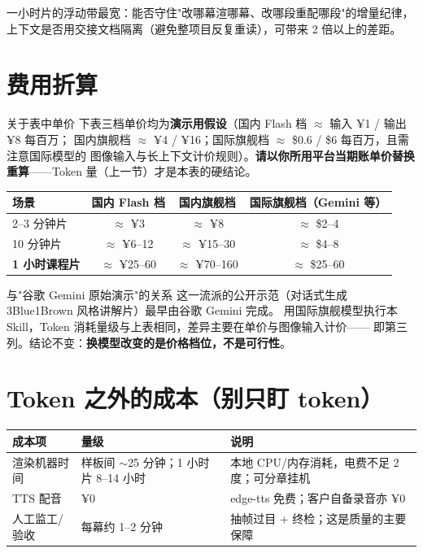 \documentclass[12pt,a4paper]{ctexart}
\begin{document}
一小时片的浮动带最宽：能否守住"改哪幕渲哪幕、改哪段重配哪段"的增量纪律，
上下文是否用交接文档隔离（避免整项目反复重读），可带来 2 倍以上的差距。

\section{费用折算}\label{sec:price}

\begin{warnbox}{关于表中单价}
下表三档单价均为\textbf{演示用假设}（国内 Flash 档 $\approx$ 输入 ¥1 / 输出 ¥8 每百万；
国内旗舰档 $\approx$ ¥4 / ¥16；国际旗舰档 $\approx$ \$0.6 / \$6 每百万，且需注意国际模型的
图像输入与长上下文计价规则）。\textbf{请以你所用平台当期账单价替换重算}——Token 量（上一节）才是本表的硬结论。
\end{warnbox}

\begin{center}
\begin{tabular}{p{3.4cm} c c c}
\hline
\rowcolor{ptbg} 场景 & 国内 Flash 档 & 国内旗舰档 & 国际旗舰档（Gemini 等） \\
\hline
2--3 分钟片 & $\approx$ ¥3 & $\approx$ ¥8 & $\approx$ \$2--4 \\
10 分钟片 & $\approx$ ¥6--12 & $\approx$ ¥15--30 & $\approx$ \$4--8 \\
\textbf{1 小时课程片} & $\approx$ ¥25--60 & $\approx$ ¥70--160 & $\approx$ \$25--60 \\
\hline
\end{tabular}
\end{center}

\begin{infobox}{与"谷歌 Gemini 原始演示"的关系}
这一流派的公开示范（对话式生成 3Blue1Brown 风格讲解片）最早由谷歌 Gemini 完成。
用国际旗舰模型执行本 Skill，Token 消耗量级与上表相同，差异主要在单价与图像输入计价——
即第三列。结论不变：\textbf{换模型改变的是价格档位，不是可行性}。
\end{infobox}

\section{Token 之外的成本（别只盯 token）}

\begin{center}
\begin{tabular}{p{3.6cm} p{4.4cm} p{5.6cm}}
\hline
\rowcolor{ptbg} 成本项 & 量级 & 说明 \\
\hline
渲染机器时间 & 样板间 $\sim$25 分钟；1 小时片 8--14 小时 & 本地 CPU/内存消耗，电费不足 2 度；可分章挂机 \\
TTS 配音 & ¥0 & edge-tts 免费；客户自备录音亦 ¥0 \\
人工监工/验收 & 每幕约 1--2 分钟 & 抽帧过目 + 终检；这是质量的主要保障 \\
\hline
\end{tabular}
\end{center}
\end{document}
